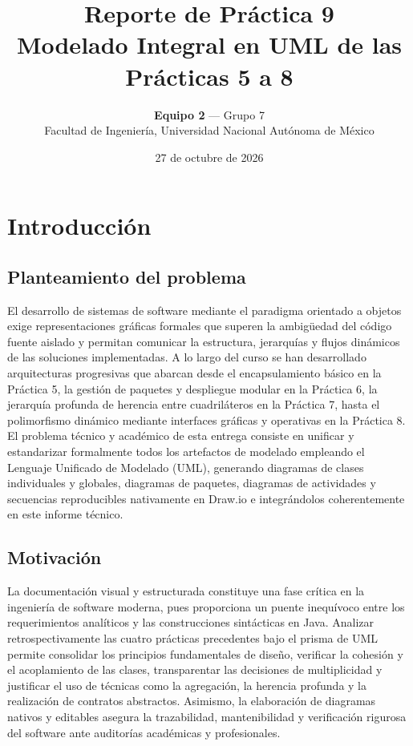 \documentclass[letterpaper,12pt,oneside]{article}
\title{\textbf{Reporte de Pr\'actica 9}\\\large Modelado Integral en UML de las Pr\'acticas 5 a 8}
\author{\textbf{Equipo 2} — Grupo 7\\Facultad de Ingenier\'ia, Universidad Nacional Aut\'onoma de M\'exico}
\date{27 de octubre de 2026}
\numberwithin{figure}{section}
\begin{document}


\tableofcontents
\clearpage


\section{Introducci\'on}

\subsection{Planteamiento del problema}
El desarrollo de sistemas de software mediante el paradigma orientado a objetos exige representaciones gr\'aficas formales que superen la ambig\"uedad del c\'odigo fuente aislado y permitan comunicar la estructura, jerarqu\'ias y flujos din\'amicos de las soluciones implementadas. A lo largo del curso se han desarrollado arquitecturas progresivas que abarcan desde el encapsulamiento b\'asico en la Pr\'actica 5, la gesti\'on de paquetes y despliegue modular en la Pr\'actica 6, la jerarqu\'ia profunda de herencia entre cuadril\'ateros en la Pr\'actica 7, hasta el polimorfismo din\'amico mediante interfaces gr\'aficas y operativas en la Pr\'actica 8. El problema t\'ecnico y acad\'emico de esta entrega consiste en unificar y estandarizar formalmente todos los artefactos de modelado empleando el Lenguaje Unificado de Modelado (UML), generando diagramas de clases individuales y globales, diagramas de paquetes, diagramas de actividades y secuencias reproducibles nativamente en Draw.io e integr\'andolos coherentemente en este informe t\'ecnico.

\subsection{Motivaci\'on}
La documentaci\'on visual y estructurada constituye una fase cr\'itica en la ingenier\'ia de software moderna, pues proporciona un puente inequ\'ivoco entre los requerimientos anal\'iticos y las construcciones sint\'acticas en Java. Analizar retrospectivamente las cuatro pr\'acticas precedentes bajo el prisma de UML permite consolidar los principios fundamentales de dise\~no, verificar la cohesi\'on y el acoplamiento de las clases, transparentar las decisiones de multiplicidad y justificar el uso de t\'ecnicas como la agregaci\'on, la herencia profunda y la realizaci\'on de contratos abstractos. Asimismo, la elaboraci\'on de diagramas nativos y editables asegura la trazabilidad, mantenibilidad y verificaci\'on rigurosa del software ante auditor\'ias acad\'emicas y profesionales.
\end{document}
